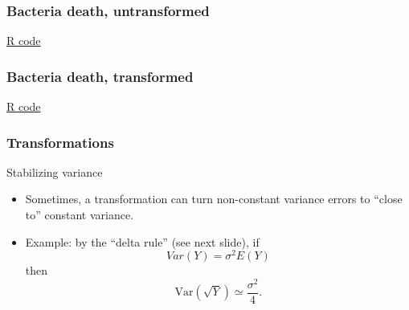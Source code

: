 \documentclass[handout]{beamer}
\begin{document}


   \begin{frame}
   \frametitle{Bacteria death, untransformed}
   \begin{center}
   \end{center}
   \href{http://stats191.stanford.edu/transformations.html#bacteria-example}{R code}
   \end{frame}



   \begin{frame}
   \frametitle{Bacteria death, transformed}
   \begin{center}
   \end{center}
   \href{http://stats191.stanford.edu/transformations.html#bacteria-example}{R code}
   \end{frame}


   \begin{frame} \frametitle{Transformations}

   \begin{block}
   {Stabilizing variance                    }
   \begin{itemize}

   \item Sometimes, a transformation can turn non-constant variance errors
   to ``close to'' constant variance.

   \item Example: by the ``delta rule'' (see next slide), if
   $$
   Var(Y) = \sigma^2 E(Y)$$
   then
   $$
   \text{Var}(\sqrt{Y}) \simeq \frac{\sigma^2}{4}.$$
   \end{itemize}

   \end{block}
   \end{frame}

\end{document}
